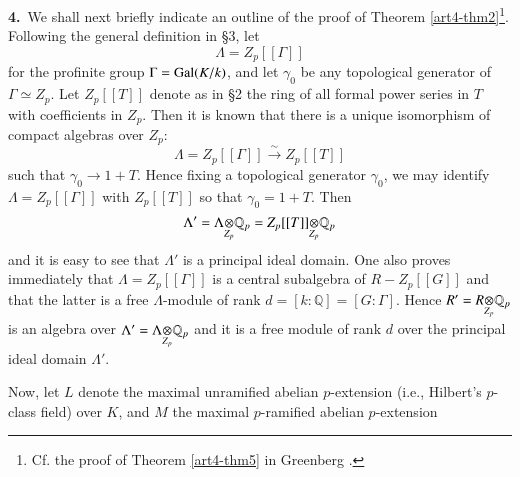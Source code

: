 \medskip
{\bf 4.}~We shall next briefly indicate an outline of the proof of Theorem \ref{art4-thm2}\footnote[8]{Cf. the proof of Theorem \ref{art4-thm5} in Greenberg \cite{art4-key2}.}. Following the general definition in \S3, let
$$
\Lambda = Z_{p}[[\Gamma]]
$$
for the profinite group $\Gamma=\operatorname{Gal}(K/k)$, and let $\gamma_{0}$ be any topological generator of $\Gamma\simeq Z_{p}$. Let $Z_{p}[[T]]$ denote as in \S2 the ring of all formal power series in $T$ with coefficients in $Z_{p}$. Then it is known that there is a unique isomorphism of compact algebras over $Z_{p}$:
$$
\Lambda = Z_{p}[[\Gamma]]\xrightarrow{\sim}Z_{p}[[T]]
$$  
such that $\gamma_{0}\to 1+T$. Hence fixing a topological generator $\gamma_{0}$, we may identify $\Lambda=Z_{p}[[\Gamma]]$ with $Z_{p}[[T]]$ so that $\gamma_{0}=1+T$. Then 
$$
\Lambda'=\foprod{\Lambda}{\mathbb{Q}_{p}}{Z_{p}}=\foprod{Z_{p}[[T]]}{\mathbb{Q}_{p}}{Z_{p}}
$$
and it is easy to see that $\Lambda'$ is a principal ideal domain. One also proves immediately that $\Lambda=Z_{p}[[\Gamma]]$ is a central subalgebra of $R-Z_{p}[[G]]$ and that the latter is a free $\Lambda$-module of rank $d=[k:\mathbb{Q}]=[G:\Gamma]$. Hence $R'=\foprod{R}{\mathbb{Q}_{p}}{Z_{p}}$ is an algebra over $\Lambda'=\foprod{\Lambda}{\mathbb{Q}_{p}}{Z_{p}}$ and it is a free module of rank $d$ over the principal ideal domain $\Lambda'$.

Now, let $L$ denote the maximal unramified abelian $p$-extension (i.e., Hilbert's $p$-class field) over $K$, and $M$ the maximal $p$-ramified abelian $p$-extension\pageoriginale 
